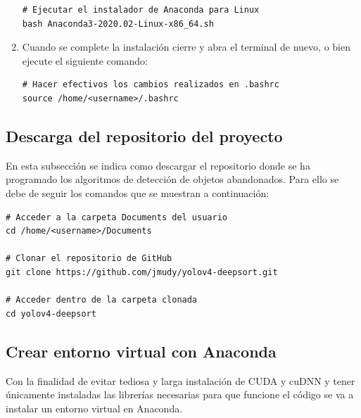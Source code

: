 \begin{enumerate}
\begin{lstlisting}[language=iPython,caption=Ejecutar el instalador de Anaconda para Linux,captionpos=b,label={lst:install-conda}]
# Ejecutar el instalador de Anaconda para Linux
bash Anaconda3-2020.02-Linux-x86_64.sh
\end{lstlisting}
    
    \item Cuando se complete la instalación cierre y abra el terminal de nuevo, o bien ejecute el siguiente comando:
    
    \vspace{0.5cm}
    
\begin{lstlisting}[language=iPython,caption=Hacer efectivo los cambios en el fichero .bashrc,captionpos=b,label={lst:source-bashrc}]
# Hacer efectivos los cambios realizados en .bashrc
source /home/<username>/.bashrc
\end{lstlisting}
\end{enumerate}

\subsection{Descarga del repositorio del proyecto}
\label{subsec:descarga-repo}

En esta subsección se indica como descargar el repositorio donde se ha programado los algoritmos de detección de objetos abandonados. Para ello se debe de seguir los comandos que se muestran a continuación:

\vspace{0.5cm}

\begin{lstlisting}[language=iPython,caption=Descarga repositorio,captionpos=b,label={lst:descarga-repo}]
# Acceder a la carpeta Documents del usuario
cd /home/<username>/Documents

# Clonar el repositorio de GitHub
git clone https://github.com/jmudy/yolov4-deepsort.git

# Acceder dentro de la carpeta clonada
cd yolov4-deepsort
\end{lstlisting}

\subsection{Crear entorno virtual con Anaconda}
\label{subsec:creacion-entorno}

Con la finalidad de evitar tediosa y larga instalación de CUDA y cuDNN y tener únicamente instaladas las librerías necesarias para que funcione el código se va a instalar un entorno virtual en Anaconda.

